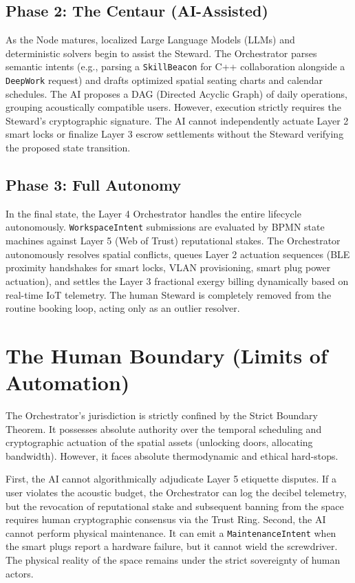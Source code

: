 \subsection{Phase 2: The Centaur (AI-Assisted)}
As the Node matures, localized Large Language Models (LLMs) and deterministic solvers begin to assist the Steward. The Orchestrator parses semantic intents (e.g., parsing a \texttt{SkillBeacon} for C++ collaboration alongside a \texttt{DeepWork} request) and drafts optimized spatial seating charts and calendar schedules. The AI proposes a DAG (Directed Acyclic Graph) of daily operations, grouping acoustically compatible users. However, execution strictly requires the Steward's cryptographic signature. The AI cannot independently actuate Layer 2 smart locks or finalize Layer 3 escrow settlements without the Steward verifying the proposed state transition.

\subsection{Phase 3: Full Autonomy}
In the final state, the Layer 4 Orchestrator handles the entire lifecycle autonomously. \texttt{WorkspaceIntent} submissions are evaluated by BPMN state machines against Layer 5 (Web of Trust) reputational stakes. The Orchestrator autonomously resolves spatial conflicts, queues Layer 2 actuation sequences (BLE proximity handshakes for smart locks, VLAN provisioning, smart plug power actuation), and settles the Layer 3 fractional exergy billing dynamically based on real-time IoT telemetry. The human Steward is completely removed from the routine booking loop, acting only as an outlier resolver.

\section{The Human Boundary (Limits of Automation)}
The Orchestrator's jurisdiction is strictly confined by the Strict Boundary Theorem. It possesses absolute authority over the temporal scheduling and cryptographic actuation of the spatial assets (unlocking doors, allocating bandwidth). However, it faces absolute thermodynamic and ethical hard-stops.

First, the AI cannot algorithmically adjudicate Layer 5 etiquette disputes. If a user violates the acoustic budget, the Orchestrator can log the decibel telemetry, but the revocation of reputational stake and subsequent banning from the space requires human cryptographic consensus via the Trust Ring. Second, the AI cannot perform physical maintenance. It can emit a \texttt{MaintenanceIntent} when the smart plugs report a hardware failure, but it cannot wield the screwdriver. The physical reality of the space remains under the strict sovereignty of human actors.

